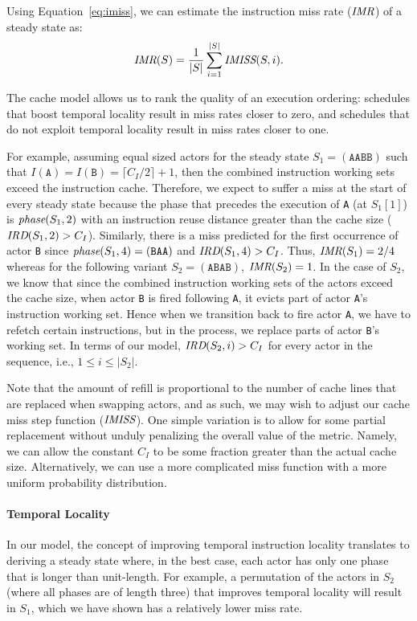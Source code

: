 Using 
Equation~\ref{eq:imiss}, we can estimate the instruction miss
rate ($\mbox{\it IMR}$) of a steady state as: 
\begin{equation}
\label{eq:imr}
  \mbox{\it IMR}(S) = \frac{1}{|S|}\sum_{i=1}^{|S|} \mbox{\it IMISS}(S,i).
\end{equation}

The cache model allows us to rank the quality of an
execution ordering: schedules that boost temporal locality
result in miss rates closer to zero, and schedules that do not
exploit temporal locality result in miss rates closer to one.

For example, assuming equal sized actors for the steady
state $S_1=(\texttt{AABB})$ such that
$I(\texttt{A})=I(\texttt{B})=\lceil{C_I/2}\rceil+1$, then the
combined instruction working 
sets exceed the instruction cache. Therefore, 
we expect to suffer a miss at the start of every
steady state because the phase that precedes the execution of
\texttt{A} (at $S_1[1]$) is $\mbox{\it phase}(S_1,2)$ with 
an instruction reuse distance greater than the cache size 
($\mbox{\it IRD}(S_1,2) > C_I$). Similarly, there is a 
miss predicted for the first occurrence of actor \texttt{B} since
$\mbox{\it phase}(S_1,4)=(\texttt{BAA})$ and 
$\mbox{\it IRD}(S_1, 4)>C_I$. Thus, $\mbox{\it IMR}(S_1)=2/4$ whereas for the
following variant $S_2=(\texttt{ABAB})$, $\mbox{\it IMR}(S_2)=1$.
In the case of $S_2$, we know that since the combined
instruction working sets of the actors exceed the cache size, when
actor \texttt{B} is fired following \texttt{A}, it evicts part of
actor \texttt{A}'s instruction working set. Hence when we transition
back to fire actor \texttt{A}, we have to refetch certain
instructions, but in the process, we replace parts of actor
\texttt{B}'s working set. In terms of our model, $\mbox{\it IRD}(S_2,i)>C_I$
for every actor in the sequence, i.e., $1\le i\le|S_2|$.

Note that the
amount of refill is proportional to the number of cache lines that are
replaced when swapping actors, and as such, we may wish to adjust
our cache miss step function ($\mbox{\it IMISS}$). One simple variation is to allow for
some partial replacement without unduly penalizing the overall value
of the metric. Namely, we can allow the constant $C_I$ to be some
fraction greater than the actual cache size. Alternatively, we can use
a more complicated miss function with a more uniform probability
distribution.

\paragraph*{Temporal Locality} In our model, the concept of improving
temporal instruction locality translates to deriving a steady state where, in the
best case, each actor has only one phase that is longer than unit-length.
For example, a permutation of the actors in $S_2$ (where all
phases are of length three) that improves temporal locality
will result in $S_1$, which we have shown has a relatively lower miss rate.


